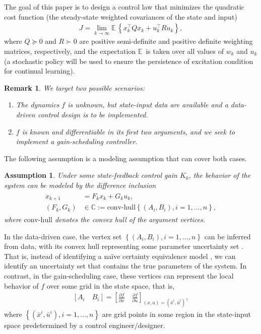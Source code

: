 \documentclass[letterpaper, 10 pt, conference]{ieeeconf}
\newcommand{\E}{\mathbb{E\,}}
\newtheorem{assumption}{Assumption}
\newtheorem{remark}{Remark}
\begin{document}
The goal of this paper is to design a control law that minimizes the quadratic cost function (the steady-state weighted covariances of the state and input)
\begin{align}
    J = \lim_{k \to \infty} \E \left \{x_k^\top Q x_k + u_k^\top R u_k \right \}, \label{eq:costFunction}
\end{align}
where $Q \succeq 0$ and $R \succ 0$ are positive semi-definite and positive definite weighting matrices, respectively, and the expectation $\E$ is taken over all values of $w_k$ and $u_k$ (a stochastic policy will be used to ensure the persistence of excitation condition \cite{de2019formulas} for continual learning).


\begin{remark} \label{remark: 2 cases covered}
We target two possible scenarios:
\begin{enumerate}
    \item The dynamics $f$ is unknown, but state-input data are available and a data-driven control design is to be implemented.
    \item $f$ is known and differentiable in its first two arguments, and we seek to implement a gain-scheduling controller.
\end{enumerate}
\end{remark}

The following assumption is a modeling assumption that can cover both cases.

\begin{assumption} \label{assumption:diff inclusion}
Under some state-feedback control gain $K_0$, the behavior of the system can be modeled by the difference inclusion \cite{boyd1993control}
\begin{align} \label{eq:diff inclusion}
\begin{aligned}
    x_{k+1} &= F_k x_k +  G_k u_k, \\
    (F_k,G_k) &\in \mathbb C := \text{conv-hull}\left \{(A_i,B_i), i=1,\hdots,n \right \},
\end{aligned}
\end{align}
where $\text{conv-hull}$ denotes the convex hull of the argument vertices.
\end{assumption}

In the data-driven case, the vertex set $\left \{(A_i,B_i), i=1,\hdots,n \right \}$ can be inferred from data, with its convex hull representing some parameter uncertainty set \cite{petersen2014robust}. That is, instead of identifying a na\"ive certainty equivalence model \cite{aastrom2012introduction}, we can identify an uncertainty set that contains the true parameters of the system. In contrast, in the gain-scheduling case, these vertices can represent the local behavior of $f$ over some grid in the state space, that is,
\begin{align} \label{eq: ABs as jacobians}
    \left[A_i \quad B_i \right]=  \left [ \frac{\partial f}{\partial x} \quad \frac{\partial f}{\partial u} \right ] _{(x,u)=(\bar x^i, \bar u^i)},
\end{align}
where $\left \{(\bar x^i, \bar u^i), i=1,\hdots,n \right \}$ are grid points in some region in the state-input space predetermined by a control engineer/designer.
\end{document}
